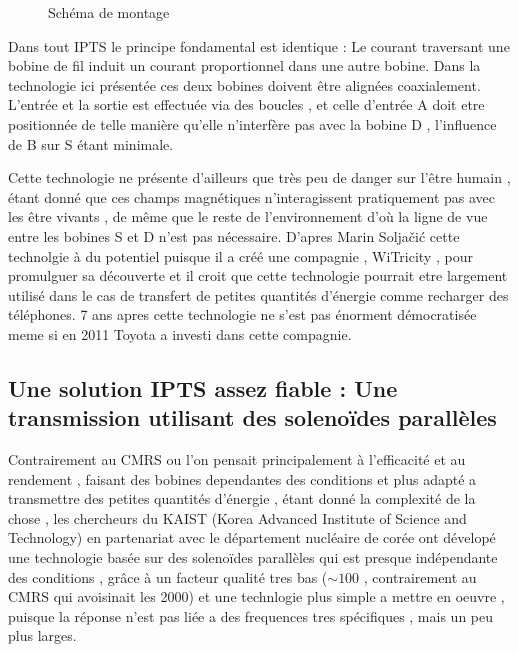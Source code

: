 \documentclass[12pt]{report}
\begin{document}
\begin{figure}
  \begin{center}
    \setlength\fboxsep{0pt}
    \setlength\fboxrule{0.5pt}
  \end{center}
  \caption{Schéma de montage}
\end{figure} Dans tout IPTS le principe fondamental est identique : Le courant traversant une bobine de fil induit un courant proportionnel dans une autre bobine. Dans la technologie ici présentée ces deux bobines doivent être alignées coaxialement. L'entrée et la sortie est effectuée via des boucles , et celle d'entrée A doit etre positionnée de telle manière qu'elle n'interfère pas avec la bobine D , l'influence de B sur S étant minimale.

  Cette technologie ne présente d'ailleurs que très peu de danger \cite{wiki1} sur l'être humain , étant donné que ces champs magnétiques n'interagissent pratiquement pas avec les être vivants , de même que le reste de l'environnement d'où la ligne de vue entre les bobines S et D n'est pas nécessaire.
 D'apres Marin Soljačić cette technolgie à du potentiel puisque il a créé une compagnie , WiTricity , pour promulguer sa découverte et il croit que cette technologie pourrait etre largement utilisé dans le cas de transfert de petites quantités d'énergie comme recharger des téléphones. 7 ans apres cette technologie ne s'est pas énorment démocratisée meme si en 2011 Toyota a investi dans cette compagnie.
\subsection{Une solution IPTS assez fiable : Une transmission utilisant des solenoïdes parallèles\cite{kaist14}}
Contrairement au CMRS ou l'on pensait principalement à l'efficacité et au rendement , faisant des bobines dependantes des conditions et plus adapté a transmettre des petites quantités d'énergie , étant donné la complexité de la chose , les chercheurs du KAIST (Korea Advanced Institute of Science and Technology) en partenariat avec le département nucléaire de corée ont dévelopé une technologie basée sur des solenoïdes parallèles qui est presque indépendante des conditions , grâce à un facteur qualité tres bas (\(\sim100\) , contrairement au CMRS qui avoisinait les 2000) et une technlogie plus simple a mettre en oeuvre , puisque la réponse n'est pas liée a des frequences tres spécifiques , mais un peu plus larges.
  
\end{document}
